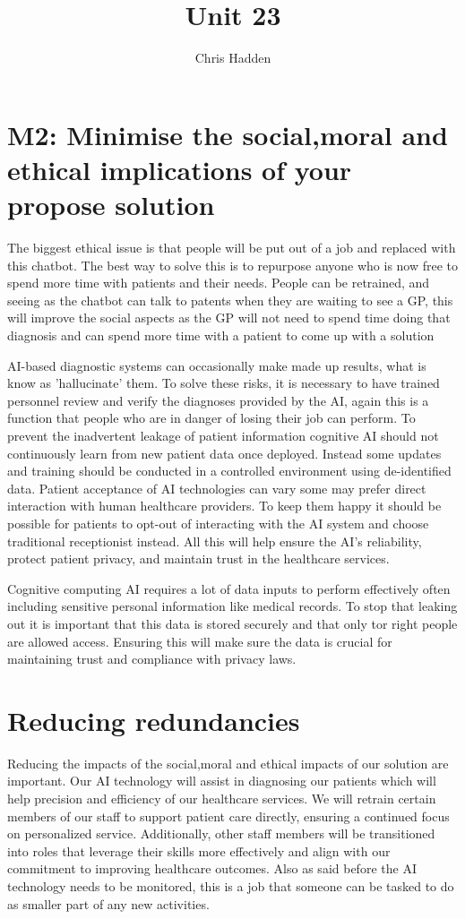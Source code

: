 \documentclass{article}
\title{Unit 23}
\author{Chris Hadden}
\date{}
\begin{document}
\maketitle

\section{M2: Minimise the social,moral and ethical implications of your propose solution}

The biggest ethical issue is that people will be put out of a job and replaced with this chatbot. The best way to solve this is to repurpose anyone who is now free to spend more time with patients and their needs. People can be retrained, and seeing as the chatbot can talk to patents when they are waiting to see a GP, this will improve the social aspects as the GP will not need to spend time doing that diagnosis and can spend more time with a patient to come up with a solution


AI-based diagnostic systems can occasionally make made up results, what is know as 'hallucinate' them. To solve these risks, it is necessary to have trained personnel review and verify the diagnoses provided by the AI, again this is a function that people who are in danger of losing their job can perform. To prevent the inadvertent leakage of patient information cognitive AI should not continuously learn from new patient data once deployed. Instead some updates and training should be conducted in a controlled environment using de-identified data.
Patient acceptance of AI technologies can vary some may prefer direct interaction with human healthcare providers. To keep them happy it should be possible for patients to opt-out of interacting with the AI system and choose traditional receptionist instead. 
All this will help ensure the AI's reliability, protect patient privacy, and maintain trust in the healthcare services.


Cognitive computing AI requires a lot of data inputs to perform effectively often including sensitive personal information like medical records. To stop that leaking out it is important that this data is stored securely and that only tor right people are allowed access. Ensuring this will make sure the data is crucial for maintaining trust and compliance with privacy laws.

\section{Reducing redundancies}
Reducing the impacts of the social,moral and ethical impacts of our solution are important.
Our AI technology will assist in diagnosing our patients which will help precision and efficiency of our healthcare services. We will retrain certain members of our staff to support patient care directly, ensuring a continued focus on personalized service. Additionally, other staff members will be transitioned into roles that leverage their skills more effectively and align with our commitment to improving healthcare outcomes. Also as said before the AI technology needs to be monitored, this is a job that someone can be tasked to do as smaller part of any new activities.
\end{document}
